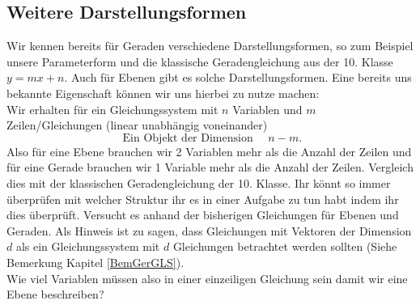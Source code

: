 \documentclass[a4paper,12pt]{article}
\begin{document}
	\subsection{Weitere Darstellungsformen}
	Wir kennen bereits für Geraden verschiedene Darstellungsformen, so zum Beispiel unsere Parameterform und 
	die klassische Geradengleichung aus der 10. Klasse $y=mx + n$. Auch für Ebenen gibt es solche 
	Darstellungsformen. Eine bereits uns bekannte Eigenschaft können wir uns hierbei zu nutze machen: \\
	Wir erhalten für ein Gleichungssystem mit $n$ Variablen und  $m$ Zeilen/Gleichungen 
	(linear unabhängig voneinander)
	{\large\[
		\text{ Ein Objekt der Dimension } \quad n - m
.\] }
	Also für eine Ebene brauchen wir 2 Variablen mehr als die Anzahl der Zeilen und für eine Gerade 
	brauchen wir 1 Variable mehr als die Anzahl der Zeilen. Vergleich dies mit der 
	klassischen Geradengleichung der 10. Klasse. Ihr könnt so immer überprüfen mit welcher Struktur ihr
	es in einer Aufgabe zu tun habt indem ihr dies überprüft. Versucht es anhand der bisherigen Gleichungen
	für Ebenen und Geraden. Als Hinweis ist zu sagen, dass Gleichungen mit Vektoren der Dimension $d$ 
	als ein Gleichungssystem mit $d$  Gleichungen betrachtet werden sollten 
	(Siehe Bemerkung Kapitel \ref{BemGerGLS}).\\
	
	Wie viel Variablen müssen also in einer einzeiligen Gleichung sein damit wir eine Ebene beschreiben? 
\end{document}
